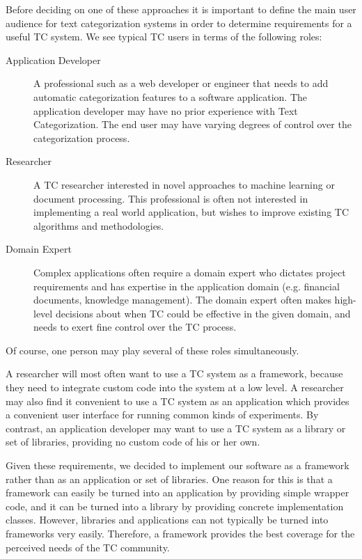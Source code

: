 \documentclass[twocolumn]{article}
\begin{document}
Before deciding on one of these approaches it is important to define
the main user audience for text categorization systems in order to determine
 requirements for a useful TC system.  We see typical TC users in terms of the following
roles:

\begin{description}
\item[Application Developer] A professional such as a web developer or
engineer that needs to add automatic categorization features to a
software application. The application developer may have no prior
experience with Text Categorization.  The end user may have varying
degrees of control over the categorization process.

\item[Researcher] A TC researcher interested in novel approaches to
machine learning or document processing.  This professional is often
not interested in implementing a real world application, but wishes to
improve existing TC algorithms and methodologies.

\item[Domain Expert] Complex applications often require a domain
expert who dictates project requirements and has expertise in the
application domain (e.g. financial documents, knowledge management).
The domain expert often makes high-level decisions about when TC could
be effective in the given domain, and needs to exert fine control over
the TC process.
\end{description}

Of course, one person may play several of these roles simultaneously.

A researcher will most often want to use a TC system as a framework,
because they need to integrate custom code into the system at a low
level.  A researcher may also find it convenient to use a TC system as
an application which provides a convenient user interface for running
common kinds of experiments.  By contrast, an application developer
may want to use a TC system as a library or set of libraries,
providing no custom code of his or her own.

Given these requirements, we decided to implement our software as a
framework rather than as an application or set of libraries.  One
reason for this is that a framework can easily be turned into an
application by providing simple wrapper code, and it can be
turned into a library by providing concrete implementation classes.
However, libraries and applications can not typically be turned into
frameworks very easily.  Therefore, a framework provides the best
coverage for the perceived needs of the TC community.
\end{document}

